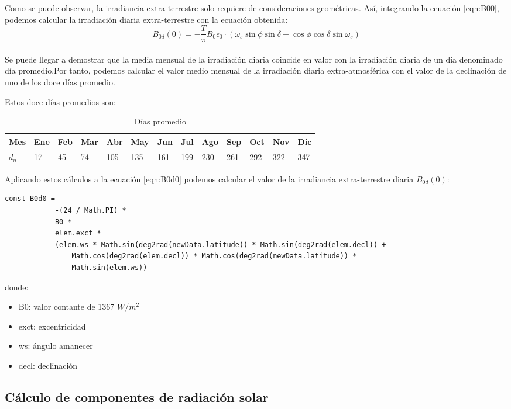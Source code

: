 Como se puede observar, la irradiancia extra-terrestre solo requiere de consideraciones geométricas. Así, integrando la ecuación \ref{eqn:B00}, podemos calcular la irradiación diaria extra-terrestre con la ecuación obtenida:\\
\begin{equation}\label{eqn:B0d0}
B_{0d}(0)=-\frac{T}{\pi}B_0\epsilon_0·(\omega_s\sin\phi\sin\delta + \cos\phi\cos\delta\sin\omega_s)
\end{equation}\\

Se puede llegar a demostrar que la media mensual de la irradiación diaria coincide en valor con la irradiación diaria de un día denominado día promedio.Por tanto, podemos calcular el valor medio mensual de la irradiación diaria extra-atmosférica con el valor de la declinación de uno de los doce días promedio.

Estos doce días promedios son:

\begin{table}[ht]
\label{tab:dias_promedio}
\centering
\begin{tabular}{|l|l|l|l|l|l|l|l|l|l|l|l|l|}
\hline
Mes   & Ene & Feb & Mar & Abr & May & Jun & Jul & Ago & Sep & Oct & Nov & Dic \\ \hline
$d_n$ & 17  & 45  & 74  & 105  & 135  & 161  & 199  & 230  & 261  & 292  & 322 & 347  \\ \hline
\end{tabular}
\caption{Días promedio}
\end{table}

Aplicando estos cálculos a la ecuación \ref{eqn:B0d0} podemos calcular el valor de la irradiancia extra-terrestre diaria $B_{0d}(0)$:
\begin{lstlisting}[style=ES6, caption={Ecuación para B0d0}]
		const B0d0 =
			-(24 / Math.PI) *
			B0 *
			elem.exct *
			(elem.ws * Math.sin(deg2rad(newData.latitude)) * Math.sin(deg2rad(elem.decl)) +
				Math.cos(deg2rad(elem.decl)) * Math.cos(deg2rad(newData.latitude)) * 
				Math.sin(elem.ws))
\end{lstlisting}
\newpage
donde:
\begin{itemize}
\item B0: valor contante de 1367 $W/m^2$
\item exct: excentricidad
\item ws: ángulo amanecer
\item decl: declinación
\end{itemize}


\subsection{Cálculo de componentes de radiación solar}
\label{section:radiation_components}


